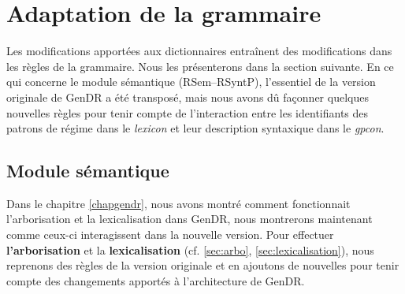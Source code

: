 \section{Adaptation de la grammaire}

Les modifications apportées aux dictionnaires entraînent des modifications dans les règles de la grammaire. Nous les présenterons dans la section suivante. En ce qui concerne le module sémantique (\ac{RSem}--\ac{RSyntP}), l'essentiel de la version originale de GenDR a été transposé, mais nous avons dû façonner quelques nouvelles règles pour tenir compte de l'interaction entre les identifiants des patrons de régime dans le \emph{lexicon} et leur description syntaxique dans le \emph{gpcon}.

\subsection{Module sémantique}

Dans le chapitre \ref{chapgendr}, nous avons montré comment fonctionnait l'arborisation et la lexicalisation dans GenDR, nous montrerons maintenant comme ceux-ci interagissent dans la nouvelle version. Pour effectuer \textbf{l'arborisation} et la \textbf{lexicalisation} (cf. \ref{sec:arbo}, \ref{sec:lexicalisation}), nous reprenons des règles de la version originale et en ajoutons de nouvelles pour tenir compte des changements apportés à l'architecture de GenDR. 

